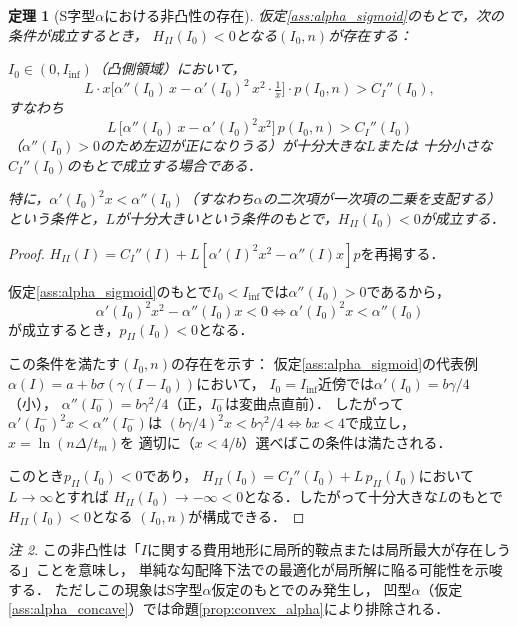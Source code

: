 \documentclass[12pt,a4paper]{article}
\theoremstyle{plain}
\newtheorem{theorem}{定理}[section]
\theoremstyle{definition}
\theoremstyle{remark}
\newtheorem{remark}[theorem]{注}
\begin{document}
\begin{theorem}[S字型$\alpha$における非凸性の存在]\label{thm:nonconvex}
仮定\ref{ass:alpha_sigmoid}のもとで，次の条件が成立するとき，
$H_{II}(I_0) < 0$となる$(I_0, n)$が存在する：

$I_0 \in (0, I_{\mathrm{inf}})$（凸側領域）において，
\begin{equation}\label{eq:nonconvex_cond}
  L \cdot x \bigl[\alpha''(I_0)\,x - \alpha'(I_0)^2\,x^2 \cdot \tfrac{1}{x}\bigr] \cdot p(I_0,n)
  > C_I''(I_0),
\end{equation}
すなわち
\begin{equation}\label{eq:nonconvex_cond2}
  L\,\bigl[\alpha''(I_0)\,x - \alpha'(I_0)^2 x^2\bigr]\,p(I_0,n) > C_I''(I_0)
\end{equation}
（$\alpha''(I_0) > 0$のため左辺が正になりうる）が十分大きな$L$または
十分小さな$C_I''(I_0)$のもとで成立する場合である．

特に，$\alpha'(I_0)^2 x < \alpha''(I_0)$（すなわち$\alpha$の二次項が一次項の二乗を支配する）
という条件と，$L$が十分大きいという条件のもとで，$H_{II}(I_0) < 0$が成立する．
\end{theorem}

\begin{proof}
$H_{II}(I) = C_I''(I) + L[\alpha'(I)^2 x^2 - \alpha''(I)x]p$を再掲する．

仮定\ref{ass:alpha_sigmoid}のもとで$I_0 < I_{\mathrm{inf}}$では$\alpha''(I_0) > 0$であるから，
\[
  \alpha'(I_0)^2 x^2 - \alpha''(I_0)x < 0 \iff \alpha'(I_0)^2 x < \alpha''(I_0)
\]
が成立するとき，$p_{II}(I_0) < 0$となる．

この条件を満たす$(I_0, n)$の存在を示す：
仮定\ref{ass:alpha_sigmoid}の代表例$\alpha(I) = a + b\sigma(\gamma(I-I_0))$において，
$I_0 = I_{\mathrm{inf}}$近傍では$\alpha'(I_0) = b\gamma/4$（小），
$\alpha''(I_0^-) = b\gamma^2/4$（正，$I_0^-$は変曲点直前）．
したがって$\alpha'(I_0^-)^2 x < \alpha''(I_0^-)$は
$(b\gamma/4)^2 x < b\gamma^2/4 \iff bx < 4$で成立し，$x = \ln(n\Delta/t_m)$を
適切に（$x < 4/b$）選べばこの条件は満たされる．

このとき$p_{II}(I_0) < 0$であり，
$H_{II}(I_0) = C_I''(I_0) + L\,p_{II}(I_0)$において$L \to \infty$とすれば
$H_{II}(I_0) \to -\infty < 0$となる．したがって十分大きな$L$のもとで$H_{II}(I_0) < 0$となる
$(I_0, n)$が構成できる．
\end{proof}

\begin{remark}
この非凸性は「$I$に関する費用地形に局所的鞍点または局所最大が存在しうる」ことを意味し，
単純な勾配降下法での最適化が局所解に陥る可能性を示唆する．
ただしこの現象はS字型$\alpha$仮定のもとでのみ発生し，
凹型$\alpha$（仮定\ref{ass:alpha_concave}）では命題\ref{prop:convex_alpha}により排除される．
\end{remark}
\end{document}
